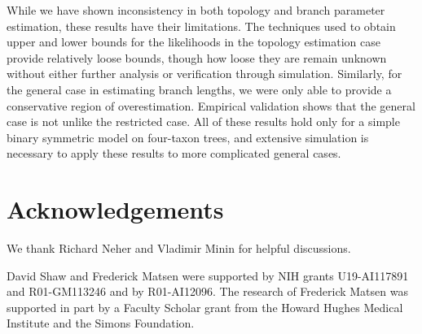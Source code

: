\documentclass{article}
\newcommand{\beginsupplement}{%
        \setcounter{table}{0}
        \renewcommand{\thetable}{S\arabic{table}}%
        \setcounter{figure}{0}
        \renewcommand{\thefigure}{S\arabic{figure}}%
     }
\begin{document}

While we have shown inconsistency in both topology and branch parameter estimation, these results have their limitations.
The techniques used to obtain upper and lower bounds for the likelihoods in the topology estimation case provide relatively loose bounds, though how loose they are remain unknown without either further analysis or verification through simulation.
Similarly, for the general case in estimating branch lengths, we were only able to provide a conservative region of overestimation.
Empirical validation shows that the general case is not unlike the restricted case.
All of these results hold only for a simple binary symmetric model on four-taxon trees, and extensive simulation is necessary to apply these results to more complicated general cases.

\section*{Acknowledgements}
We thank Richard Neher and Vladimir Minin for helpful discussions.

David Shaw and Frederick Matsen were supported by NIH grants U19-AI117891 and R01-GM113246 and by R01-AI12096.
The research of Frederick Matsen was supported in part by a Faculty Scholar grant from the Howard Hughes Medical Institute and the Simons Foundation.




\newpage
\beginsupplement


\end{document}
